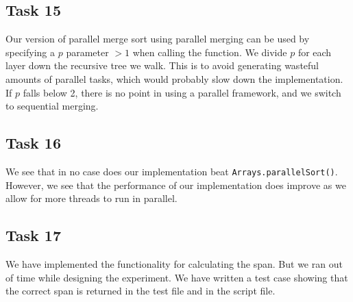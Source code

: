 \documentclass[11pt, a4paper]{article}
\begin{document}
\subsection{Task 15}

Our version of parallel merge sort using parallel merging can be used by specifying a $p$ parameter $> 1$ when calling the function.
We divide $p$ for each layer down the recursive tree we walk. This is to avoid generating wasteful amounts of parallel tasks, which would probably slow down the implementation.
If $p$ falls below 2, there is no point in using a parallel framework, and we switch to sequential merging.

\subsection{Task 16}

We see that in no case does our implementation beat \texttt{Arrays.parallelSort()}. However, we see that the performance of our implementation does improve as we allow for more threads to run in parallel.

\subsection{Task 17}

We have implemented the functionality for calculating the span. But we ran out of time while designing the experiment. We have written a test case showing that the correct span is returned in the test file and in the script file.

\newpage


\end{document}
